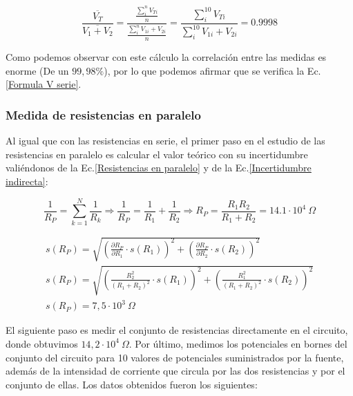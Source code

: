 \documentclass[a4paper,12pt,titlepage]{article}
\begin{document}
\begin{equation}
    \frac{\overline{V_{T}}}{\overline{V_{1}+V_{2}}}=\frac{\frac{\sum_{i}^{n}V_{Ti}}{n}}{\frac{\sum_{i}^{n}V_{1i}+V_{2i}}{n}}=\frac{\sum_{i}^{10}V_{Ti}}{\sum_{i}^{10}V_{1i}+V_{2i}}=0.9998
\end{equation}

Como podemos observar con este cálculo la correlación entre las medidas es enorme (De un $99,98\%$), por lo que podemos afirmar que se verifica la Ec.\ref{Formula V serie}.

\subsubsection{Medida de resistencias en paralelo}

Al igual que con las resistencias en serie, el primer paso en el estudio de las resistencias en paralelo es calcular el valor teórico con su incertidumbre valiéndonos de la Ec.\ref{Resistencias en paralelo} y de la Ec.\ref{Incertidumbre indirecta}:

\begin{equation}
     \frac{1}{R_{P}}=\sum_{k=1}^N\frac{1}{R_{k}} \Rightarrow \frac{1}{R_{P}}=\frac{1}{R_{1}}+\frac{1}{R_{2}} \Rightarrow R_{P}=\frac{R_{1}R_{2}}{R_{1}+R_{2}}=14.1 \cdot 10^4\: \Omega
\end{equation}

\begin{equation}
    \begin{gathered}
    s(R_{P})= \sqrt{\left (\frac{\partial R_{P}}{\partial R_{1}} \cdot s(R_{1})\right )^2+\left (\frac{\partial R_{P}}{\partial R_{2}} \cdot s(R_{2}) \right )^2} \\
    s(R_{P})=\sqrt{\left (\frac{R_{2}^2}{(R_{1}+R_{2})^2} \cdot s(R_{1})\right )^2+\left (\frac{R_{1}^2}{(R_{1}+R_{2})^2} \cdot s(R_{2}) \right )^2} \\
    s(R_{P})= 7,5 \cdot 10^3 \: \Omega
    \end{gathered}
\end{equation}

El siguiente paso es medir el conjunto de resistencias directamente en el circuito, donde obtuvimos $14,2 \cdot 10^4 \: \Omega$. Por último, medimos los potenciales en bornes del conjunto del circuito para 10 valores de potenciales suministrados por la fuente, además de la intensidad de corriente que circula por las dos resistencias y por el conjunto de ellas. Los datos obtenidos fueron los siguientes: 
\end{document}
